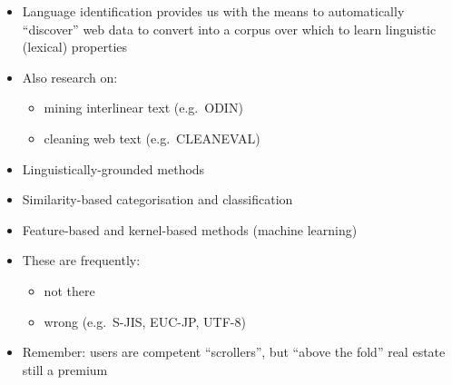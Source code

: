 \documentclass[a4paper,landscape,headrule,footrule,xetex]{foils}
\begin{document}
\begin{itemize}
\item Language identification provides us with the means to
  automatically ``discover'' web data to convert into a corpus over
  which to learn linguistic (lexical) properties
\item Also research on:
  \begin{itemize}
  \item mining interlinear text (e.g.\ ODIN)
  \item cleaning web text (e.g.\ CLEANEVAL)
  \end{itemize}

\end{itemize}





\begin{itemize}
\item Linguistically-grounded methods
\item Similarity-based categorisation and classification
\item Feature-based and kernel-based methods (machine learning)
\end{itemize}







\begin{itemize}
\item These are frequently:
\begin{itemize}
\item not there
\item wrong (e.g.\ S-JIS, EUC-JP, UTF-8)
\end{itemize}
\item Remember: users are competent ``scrollers'', but ``above the
  fold'' real estate still a premium
\end{itemize}















\end{document}
